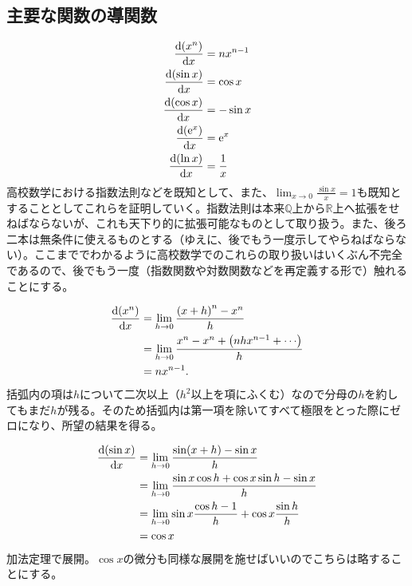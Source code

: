\subsection{主要な関数の導関数}
\begin{align}
    \begin{aligned}
        \diff{\pare{x^n}}{x}          & =nx^{n-1}     \\
        \diff{\pare{\sin x}}{x}       & =\cos x       \\
        \diff{\pare{\cos x}}{x}       & =-\sin x      \\
        \diff{\pare{\mathrm{e}^x}}{x} & =\mathrm{e}^x \\
        \diff{\pare{\ln x}}{x}        & =\frac{1}x
    \end{aligned}\label{eq:1.3}
\end{align}
高校数学における指数法則などを既知として、また、$\lim_{x\to 0}\frac{\sin x}{x}=1$も既知とすることとしてこれらを証明していく。指数法則は本来$\mathbb{Q}$上から$\mathbb{R}$上へ拡張をせねばならないが、これも天下り的に拡張可能なものとして取り扱う。また、後ろ二本は無条件に使えるものとする（ゆえに、後でもう一度示してやらねばならない）。ここまででわかるように高校数学でのこれらの取り扱いはいくぶん不完全であるので、後でもう一度（指数関数や対数関数などを再定義する形で）触れることにする。

\begin{align*}
    \diff{\pare{x^n}}{x} & =\lim_{h\to 0}\frac{\pare{x+h}^{n}-x^n}{h}              \\
                         & =\lim_{h\to 0}\frac{x^n-x^n+\pare{nhx^{n-1}+\cdots}}{h} \\
                         & =nx^{n-1}.
\end{align*}
括弧内の項は$h$について二次以上（$h^2$以上を項にふくむ）なので分母の$h$を約してもまだ$h$が残る。そのため括弧内は第一項を除いてすべて極限をとった際にゼロになり、所望の結果を得る。

\begin{align*}
    \diff{\pare{\sin x}}{x} & =\lim_{h\to 0}\frac{\sin\pare{x+h}-\sin{x}}{h}                \\
                            & =\lim_{h\to 0}\frac{\sin x\cos h+\cos x\sin h-\sin x}{h}      \\
                            & =\lim_{h\to 0}\sin x\frac{\cos h-1}{h}+\cos x\frac{\sin h}{h} \\
                            & =\cos x
\end{align*}
加法定理で展開。$\cos x$の微分も同様な展開を施せばいいのでこちらは略することにする。
